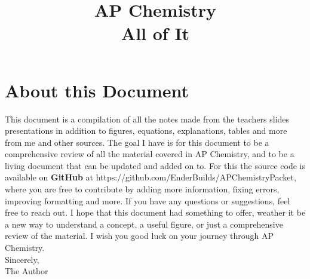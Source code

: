 \documentclass[10pt,letterpaper,titlepage,twocolumn]{article}
\numberwithin{equation}{section}
\begin{document}
\title{AP Chemistry\\[1ex] \large All of It}
\maketitle
\tableofcontents
\listoffigures
\listoftables
\clearpage










\clearpage
\appendix



\clearpage
\section*{About this Document}
This document is a compilation of all the notes made from the teachers slides presentations in addition to figures, equations, explanations, tables and more from me and other sources. The goal I have is for this document to be a comprehensive review of all the material covered in AP Chemistry, and to be a living document that can be updated and added on to. For this the source code is available on \textbf{GitHub} at https://github.com/EnderBuilds/APChemistryPacket, where you are free to contribute by adding more information, fixing errors, improving formatting and more. If you have any questions or suggestions, feel free to reach out. I hope that this document had something to offer, weather it be a new way to understand a concept, a useful figure, or just a comprehensive review of the material. I wish you good luck on your journey through AP Chemistry.\\
Sincerely,\\
The Author
\end{document}
